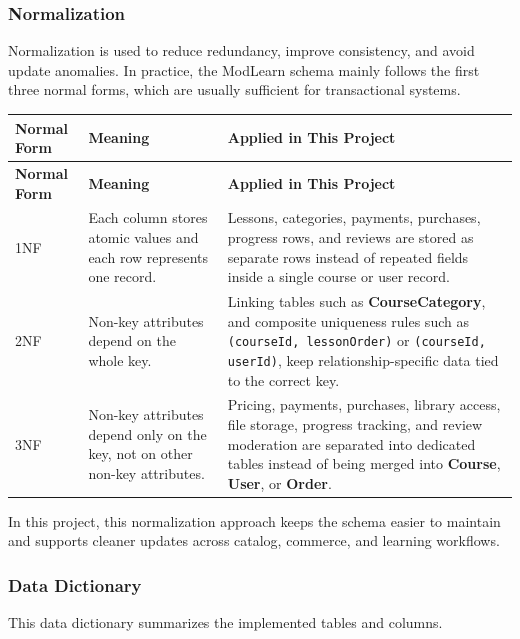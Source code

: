 \subsubsection{Normalization}

\noindent
Normalization is used to reduce redundancy, improve consistency, and avoid update anomalies. In practice, the ModLearn schema mainly follows the first three normal forms, which are usually sufficient for transactional systems.

\begingroup
\small
\renewcommand{\arraystretch}{1.15}
\begin{longtable}{L{2.1cm}L{4.3cm}L{7.0cm}}
\toprule
\textbf{Normal Form} & \textbf{Meaning} & \textbf{Applied in This Project} \\
\midrule
\endfirsthead
\toprule
\textbf{Normal Form} & \textbf{Meaning} & \textbf{Applied in This Project} \\
\midrule
\endhead
\bottomrule
\endfoot
1NF & Each column stores atomic values and each row represents one record. & Lessons, categories, payments, purchases, progress rows, and reviews are stored as separate rows instead of repeated fields inside a single course or user record. \\
2NF & Non-key attributes depend on the whole key. & Linking tables such as \textbf{CourseCategory}, and composite uniqueness rules such as \texttt{(courseId, lessonOrder)} or \texttt{(courseId, userId)}, keep relationship-specific data tied to the correct key. \\
3NF & Non-key attributes depend only on the key, not on other non-key attributes. & Pricing, payments, purchases, library access, file storage, progress tracking, and review moderation are separated into dedicated tables instead of being merged into \textbf{Course}, \textbf{User}, or \textbf{Order}. \\
\end{longtable}
\endgroup

\noindent
In this project, this normalization approach keeps the schema easier to maintain and supports cleaner updates across catalog, commerce, and learning workflows.

\subsubsection{Data Dictionary}

\noindent
This data dictionary summarizes the implemented tables and columns.

\begingroup
\small
\renewcommand{\arraystretch}{1.15}


